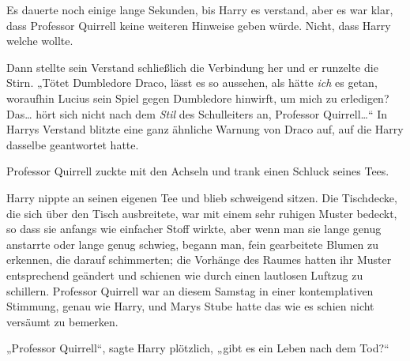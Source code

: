 Es dauerte noch einige lange Sekunden, bis Harry es verstand, aber es war klar, dass Professor Quirrell keine weiteren Hinweise geben würde. Nicht, dass Harry welche wollte.

Dann stellte sein Verstand schließlich die Verbindung her und er runzelte die Stirn. „Tötet Dumbledore Draco, lässt es so aussehen, als hätte \emph{ich} es getan, woraufhin Lucius sein Spiel gegen Dumbledore hinwirft, um mich zu erledigen? Das… hört sich nicht nach dem \emph{Stil} des Schulleiters an, Professor Quirrell…“ In Harrys Verstand blitzte eine ganz ähnliche Warnung von Draco auf, auf die Harry dasselbe geantwortet hatte.

Professor Quirrell zuckte mit den Achseln und trank einen Schluck seines Tees.

Harry nippte an seinen eigenen Tee und blieb schweigend sitzen. Die Tischdecke, die sich über den Tisch ausbreitete, war mit einem sehr ruhigen Muster bedeckt, so dass sie anfangs wie einfacher Stoff wirkte, aber wenn man sie lange genug anstarrte oder lange genug schwieg, begann man, fein gearbeitete Blumen zu erkennen, die darauf schimmerten; die Vorhänge des Raumes hatten ihr Muster entsprechend geändert und schienen wie durch einen lautlosen Luftzug zu schillern. Professor Quirrell war an diesem Samstag in einer kontemplativen Stimmung, genau wie Harry, und Marys Stube hatte das wie es schien nicht versäumt zu bemerken.

„Professor Quirrell“, sagte Harry plötzlich, „gibt es ein Leben nach dem Tod?“

